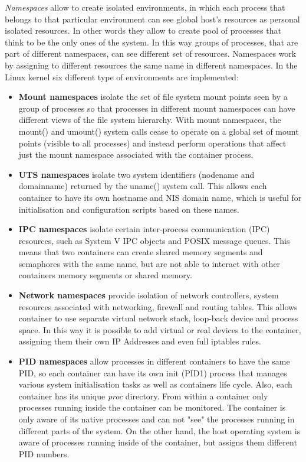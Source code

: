 \documentclass[a4paper,12pt]{article}
\begin{document}
\textit{Namespaces} allow to create isolated environments, in which each process
that belongs to that particular environment can see global host's resources as
personal isolated resources. In other words they allow to create pool of
processes that think to be the only ones of the system. In this way groups of
processes, that are part of different namespaces, can see different set of
resources. Namespaces work by assigning to different resources the same name in
different namespaces. In the Linux kernel six different type of environments are
implemented\cite{red_hat_introduction_to_namespaces}:
  \begin{itemize}
    \item \textbf{Mount namespaces} isolate the set of file system mount points
    seen by a group of processes so that processes in different mount namespaces
    can have different views of the file system hierarchy. With mount
    namespaces, the mount() and umount() system calls cease to operate on a
    global set of mount points (visible to all processes) and instead perform
    operations that affect just the mount namespace associated with the
    container process. 
    \item \textbf{UTS namespaces} isolate two system identifiers (nodename and
    domainname) returned by the uname() system call. This allows each container
    to have its own hostname and NIS domain name, which is useful for
    initialisation and configuration scripts based on these names. 
    \item \textbf{IPC namespaces} isolate certain inter-process communication
    (IPC) resources, such as System V IPC objects and POSIX message queues. This
    means that two containers can create shared memory segments and semaphores
    with the same name, but are not able to interact with other containers
    memory segments or shared memory. 
    \item \textbf{Network namespaces} provide isolation of network controllers,
    system resources associated with networking, firewall and routing tables.
    This allows container to use separate virtual network stack, loop-back device
    and process space. In this way it is possible to add virtual or real devices
    to the container, assigning them their own IP Addresses and even full iptables
    rules. 
    \item \textbf{PID namespaces} allow processes in different containers to
    have the same PID, so each container can have its own init (PID1) process
    that manages various system initialisation tasks as well as containers life
    cycle. Also, each container has its unique \textit{\/proc} directory. From
    within a container only processes running inside the container can be
    monitored. The container is only aware of its native processes and can not
    "see" the processes running in different parts of the system. On the other
    hand, the host operating system is aware of processes running inside of the
    container, but assigns them different PID numbers.
  \end{itemize} 
\end{document}
